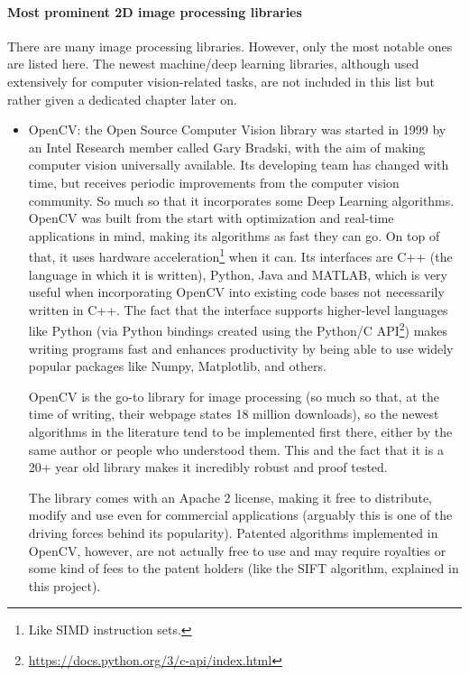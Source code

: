 \documentclass[../main.tex]{subfiles}
\begin{document}
\paragraph{Most prominent 2D image processing libraries} 
There are many image processing libraries. However, only the most notable ones are listed here. The newest machine/deep learning libraries, although used extensively for computer vision-related tasks, are not included in this list but rather given a dedicated chapter later on.
\begin{itemize}
    \item OpenCV: the Open Source Computer Vision library was started in 1999 by an Intel Research member called Gary Bradski, with the aim of making computer vision universally available. Its developing team has changed with time, but receives periodic improvements from the computer vision community. So much so that it incorporates some Deep Learning algorithms. OpenCV was built from the start with optimization and real-time applications in mind, making its algorithms as fast they can go. On top of that, it uses hardware acceleration\footnote{Like SIMD instruction sets.} when it can. Its interfaces are C++ (the language in which it is written), Python, Java and MATLAB, which is very useful when incorporating OpenCV into existing code bases not necessarily written in C++. The fact that the interface supports higher-level languages like Python (via Python bindings created using the Python/C API\footnote{\url{https://docs.python.org/3/c-api/index.html}}) makes writing programs fast and enhances productivity by being able to use widely popular packages like Numpy, Matplotlib, and others.
    
    OpenCV is the go-to library for image processing (so much so that, at the time of writing, their webpage states 18 million downloads), so the newest algorithms in the literature tend to be implemented first there, either by the same author or people who understood them. This and the fact that it is a 20+ year old library makes it incredibly robust and proof tested.

    The library comes with an Apache 2 license, making it free to distribute, modify and use even for commercial applications (arguably this is one of the driving forces behind its popularity). Patented algorithms implemented in OpenCV, however, are not actually free to use and may require royalties or some kind of fees to the patent holders (like the SIFT algorithm, explained in this project).


\end{itemize}
\end{document}
